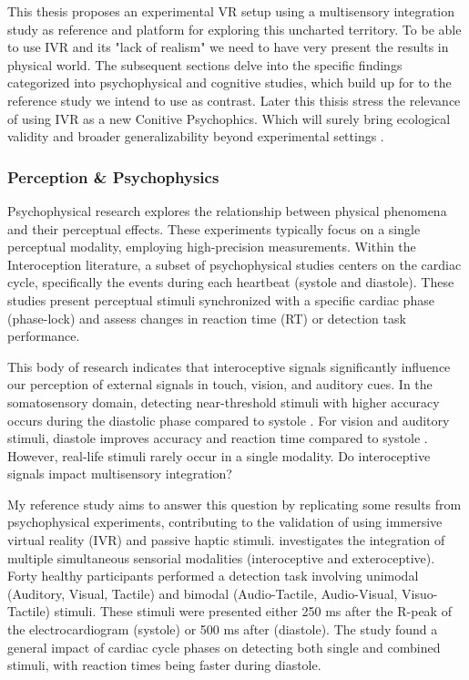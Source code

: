 \documentclass[12pt,oneside,openright]{report}
\begin{document}
This thesis proposes an experimental VR setup using a multisensory integration study as reference and platform for exploring this uncharted territory. To be able to use IVR and its "lack of realism" we need to have very present the results in physical world. The subsequent sections delve into the specific findings categorized into psychophysical and cognitive studies, which build up for to the reference study we intend to use as contrast. Later this thisis stress the relevance of using IVR as a new Conitive Psychophics. Which will surely bring ecological validity and  broader generalizability beyond experimental settings \parencite{NASTASE2020117254}.

\subsubsection*{Perception \& Psychophysics}

Psychophysical research explores the relationship between physical phenomena and their perceptual effects. These experiments typically focus on a single perceptual modality, employing high-precision measurements. Within the Interoception literature, a subset of psychophysical studies centers on the cardiac cycle, specifically the events during each heartbeat (systole and diastole). These studies present perceptual stimuli synchronized with a specific cardiac phase (phase-lock) and assess changes in reaction time (RT) or detection task performance.

This body of research indicates that interoceptive signals significantly influence our perception of external signals in touch, vision, and auditory cues. In the somatosensory domain, detecting near-threshold stimuli with higher accuracy occurs during the diastolic phase compared to systole \parencite{esra_p, AL2021118247, Grund643, motyka}. For vision and auditory stimuli, diastole improves accuracy and reaction time compared to systole \parencite{SALTAFOSSI2023108642}. However, real-life stimuli rarely occur in a single modality. Do interoceptive signals impact multisensory integration?

My reference study aims to answer this question by replicating some results from psychophysical experiments, contributing to the validation of using immersive virtual reality (IVR) and passive haptic stimuli. \textcite{SALTAFOSSI2023108642} investigates the integration of multiple simultaneous sensorial modalities (interoceptive and exteroceptive). Forty healthy participants performed a detection task involving unimodal (Auditory, Visual, Tactile) and bimodal (Audio-Tactile, Audio-Visual, Visuo-Tactile) stimuli. These stimuli were presented either 250 ms after the R-peak of the electrocardiogram (systole) or 500 ms after (diastole). The study found a general impact of cardiac cycle phases on detecting both single and combined stimuli, with reaction times being faster during diastole.
\end{document}
